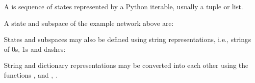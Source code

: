\documentclass[letterpaper,10pt,english]{sphinxmanual}
\begin{document}
\begin{sphinxVerbatim}[commandchars=\\\{\}]
  
\end{sphinxVerbatim}

A  is sequence of states represented by a Python iterable, usually a tuple or list.

A state and subspace of the example network above are:

\begin{sphinxVerbatim}[commandchars=\\\{\}]
  
  
\end{sphinxVerbatim}

States and subspaces may also be defined using string representations, i.e., strings of 0s, 1s and dashes:

\begin{sphinxVerbatim}[commandchars=\\\{\}]
  
  
\end{sphinxVerbatim}

String and dictionary representations may be converted into each other using the functions
{\hyperref[\detokenize{StateTransitionGraphs:state2str}]{}}, {\hyperref[\detokenize{StateTransitionGraphs:state2dict}]{}} and {\hyperref[\detokenize{StateTransitionGraphs:subspace2str}]{}}, {\hyperref[\detokenize{StateTransitionGraphs:subspace2dict}]{}}.
\end{document}
